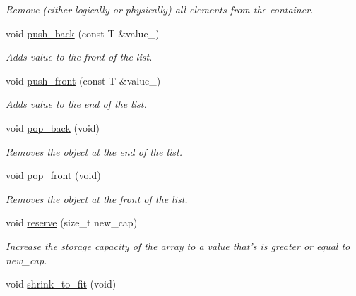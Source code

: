 \begin{DoxyCompactItemize}
\begin{DoxyCompactList}\small\item\em Remove (either logically or physically) all elements from the container. \end{DoxyCompactList}\item 
void \hyperlink{classls_1_1vector_ad1a58fe0c99641781abdfa8e09e78d8a}{push\+\_\+back} (const T \&value\+\_\+)
\begin{DoxyCompactList}\small\item\em Adds value to the front of the list. \end{DoxyCompactList}\item 
void \hyperlink{classls_1_1vector_aa47709582bda7b077ecd872f9bcaab27}{push\+\_\+front} (const T \&value\+\_\+)
\begin{DoxyCompactList}\small\item\em Adds value to the end of the list. \end{DoxyCompactList}\item 
void \hyperlink{classls_1_1vector_a14f1f81fdf7c217436a711fc146dd468}{pop\+\_\+back} (void)\hypertarget{classls_1_1vector_a14f1f81fdf7c217436a711fc146dd468}{}\label{classls_1_1vector_a14f1f81fdf7c217436a711fc146dd468}

\begin{DoxyCompactList}\small\item\em Removes the object at the end of the list. \end{DoxyCompactList}\item 
void \hyperlink{classls_1_1vector_a70a3d59cfa4558d7efbb42f8a8e772d7}{pop\+\_\+front} (void)\hypertarget{classls_1_1vector_a70a3d59cfa4558d7efbb42f8a8e772d7}{}\label{classls_1_1vector_a70a3d59cfa4558d7efbb42f8a8e772d7}

\begin{DoxyCompactList}\small\item\em Removes the object at the front of the list. \end{DoxyCompactList}\item 
void \hyperlink{classls_1_1vector_aa883624fb03f14034911d0a0e3341f97}{reserve} (size\+\_\+t new\+\_\+cap)\hypertarget{classls_1_1vector_aa883624fb03f14034911d0a0e3341f97}{}\label{classls_1_1vector_aa883624fb03f14034911d0a0e3341f97}

\begin{DoxyCompactList}\small\item\em Increase the storage capacity of the array to a value that’s is greater or equal to new\+\_\+cap. \end{DoxyCompactList}\item 
void \hyperlink{classls_1_1vector_a9468a8d103dfe4b4979d26668cab9c63}{shrink\+\_\+to\+\_\+fit} (void)\hypertarget{classls_1_1vector_a9468a8d103dfe4b4979d26668cab9c63}{}\label{classls_1_1vector_a9468a8d103dfe4b4979d26668cab9c63}


\end{DoxyCompactItemize}
